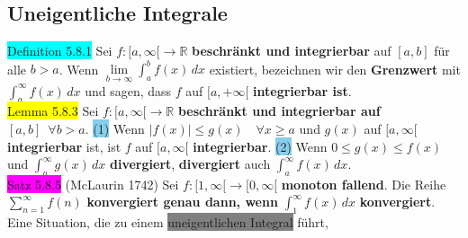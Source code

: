 \documentclass[landscape, 10pt]{article}
\newcommand{\R}{\mathbb{R}}
\begin{document}
\begin{multicols}{3}
       \subsection{Uneigentliche Integrale}
              \colorbox{cyan}{Definition 5.8.1} 
                     Sei \textcolor{NavyBlue}{$f:[a,\infty[\longrightarrow\R$}
                     \textbf{beschränkt und integrierbar} auf 
                     \textcolor{NavyBlue}{$[a,b]$} für alle 
                     \textcolor{NavyBlue}{$b>a$}. 
                     Wenn \textcolor{NavyBlue}{
                     $\lim\limits_{b\to\infty}\int_a^bf(x)\,dx$} 
                     existiert, bezeichnen wir den \textbf{Grenzwert} mit 
                     \textcolor{NavyBlue}{$\int_a^\infty f(x)\,dx$} 
                     und sagen, dass \textcolor{NavyBlue}{$f$} auf 
                     \textcolor{NavyBlue}{$[a,+\infty[$} 
                     \textbf{integrierbar ist}.\\
              \colorbox{yellow}{Lemma 5.8.3} 
                     Sei \textcolor{NavyBlue}{$f:[a,\infty[\longrightarrow\R$} 
                     \textbf{beschränkt und integrierbar auf} 
                     \textcolor{NavyBlue}{$[a,b]\enspace\forall b>a$}. 
                     \colorbox{SkyBlue}{(1)} Wenn 
                     \textcolor{NavyBlue}{$|f(x)|\leqslant g(x)\quad\forall x\geqslant a$}
                     und \textcolor{NavyBlue}{$g(x)$} auf \textcolor{NavyBlue}{$[a,\infty[$} 
                     \textbf{integrierbar} ist, ist 
                     \textcolor{NavyBlue}{$f$} auf \textcolor{NavyBlue}{$[a,\infty[$}
                     \textbf{integrierbar}. 
                     \colorbox{SkyBlue}{(2)} Wenn 
                     \textcolor{NavyBlue}{$0\leqslant g(x)\leqslant f(x)$} 
                     und \textcolor{NavyBlue}{$\int_a^\infty g(x)\,dx$} 
                     \textbf{divergiert}, \textbf{divergiert} auch 
                     \textcolor{NavyBlue}{$\int_a^\infty f(x)\,dx$}.\\
              \colorbox{magenta}{Satz 5.8.5} (McLaurin 1742) Sei 
                     \textcolor{NavyBlue}{$f:[1,\infty[\longrightarrow[0,\infty[$} 
                     \textbf{monoton fallend}. Die Reihe 
                     \textcolor{NavyBlue}{$\sum_{n=1}^\infty f(n)$} 
                     \textbf{konvergiert genau dann, wenn} 
                     \textcolor{NavyBlue}{$\int_1^\infty f(x)\,dx$} 
                     \textbf{konvergiert}. \\
              Eine Situation, die zu einem 
                     \colorbox{gray}{uneigentlichen Integral} führt, 

\end{multicols}
\end{document}
